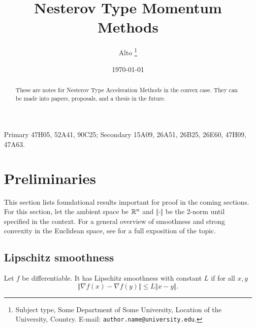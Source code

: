 \documentclass[12pt]{article}
\begin{document}
\title{{\selectfont Nesterov Type Momentum Methods}}

\author{
    Alto
    \thanks{
        Subject type, Some Department of Some University, Location of the University,
        Country. E-mail: \texttt{author.name@university.edu}.
    }
}

\date{\today}

\maketitle


\begin{abstract} 
    \noindent
    These are notes for Nesterov Type Acceleration Methods in the convex case. 
    They can be made into papers, proposals, and a thesis in the future. 
\end{abstract}
Primary 47H05, 52A41, 90C25; Secondary 15A09, 26A51, 26B25, 26E60, 47H09, 47A63.

\section{Preliminaries}
    This section lists foundational results important for proof in the coming sections. 
    For this section, let the ambient space be $\mathbb R^n$ and $\Vert \cdot\Vert$ be the 2-norm until specified in the context. 
    For a general overview of smoothness and strong convexity in the Euclidean space, see \cite[theorem 2.1.5, theorem 2.1.10]{nesterov_lectures_2018} for a full exposition of the topic. 
    \subsection{Lipschitz smoothness}
        \begin{definition}
            Let $f$ be differentiable. 
            It has Lipschitz smoothness with constant $L$ if for all $x, y$
            $$
                \Vert \nabla f(x) - \nabla f(y)\Vert 
                \le 
                L \Vert x - y\Vert. 
            $$    
        \end{definition}
\end{document}
